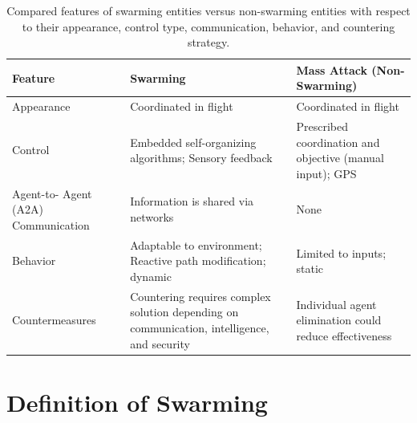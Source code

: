 \begin{table}[]
\begin{tabular}{p{3cm}p{6cm}p{6cm}}
\hline
\textbf{Feature} & \textbf{Swarming} & \textbf{Mass Attack (Non-Swarming)} \\ \hline
Appearance & Coordinated in flight & Coordinated in flight \\ \hline
Control & Embedded self-organizing algorithms; Sensory feedback & Prescribed coordination and objective (manual input); GPS \\ \hline
Agent-to- Agent (A2A) Communication & Information is shared via networks & None \\ \hline
Behavior & Adaptable to environment; Reactive path modification;   dynamic & Limited to inputs; static \\ \hline
Countermeasures & Countering requires complex solution depending on   communication, intelligence, and security & Individual agent elimination could reduce effectiveness \\ \hline
\end{tabular}
\caption{Compared features of swarming entities versus non-swarming entities with respect to their appearance, control type, communication, behavior, and countering strategy.}
\label{tab:my-table}
\end{table}


\section*{Definition of Swarming}

